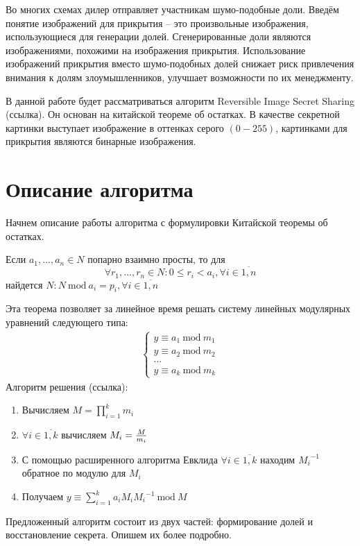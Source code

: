 \documentclass[a4paper,article,14pt]{extarticle}
\newcommand{\Mod}[1]{\ \mathrm{mod}\ #1}
\begin{document}
Во многих схемах дилер отправляет участникам шумо-подобные доли. Введём понятие изображений для прикрытия -- это произвольные 
изображения, использующиеся для генерации долей. Сгенерированные доли являются изображениями, похожими на изображения прикрытия. 
Использование изображений прикрытия вместо шумо-подобных долей снижает риск привлечения внимания к долям злоумышленников, улучшает возможности 
по их менеджменту. 

В данной работе будет рассматриваться алгоритм Reversible Image Secret Sharing (ссылка). Он основан на китайской 
теореме об остатках. В качестве секретной картинки выступает изображение в оттенках серого $(0-255)$, картинками для прикрытия являются
бинарные изображения.


\newpage
\section{Описание алгоритма}
Начнем описание работы алгоритма с формулировки Китайской теоремы об остатках.

Если $ a_1,...,a_n \in N $ попарно взаимно просты, то для 
$$\forall r_1,...,r_n \in N : 0\leq r_i<a_i, \forall i\in \overline{1,n}$$
найдется $N: N \Mod a_i = p_i, \forall i\in \overline{1,n}$ 

Эта теорема позволяет за линейное время решать систему линейных модулярных уравнений следующего типа:
\begin{gather}
    \begin{cases}
    y \equiv a_1 \Mod m_1 \\
    y \equiv a_2 \Mod m_2 \\
    ... \\
    y \equiv a_k \Mod m_k
    \end{cases}
\end{gather}
Алгоритм решения (ссылка):
\begin{enumerate}
    \item Вычисляем $M=\prod\limits_{i = 1}^k m_i$
    \item $\forall i\in \overline{1,k}$ вычисляем $M_i={{M} \over {m_i}}$
    \item С помощью расширенного алгоритма Евклида $\forall i\in \overline{1,k}$ находим ${M_i}^{-1}$ обратное по модулю для $M_i$
    \item Получаем $y \equiv \sum\limits_{i=1}^k a_i M_i {M_i}^{-1} \Mod M$
\end{enumerate}

Предложенный алгоритм состоит из двух частей: формирование долей и восстановление секрета. Опишем их более подробно.
\end{document}
